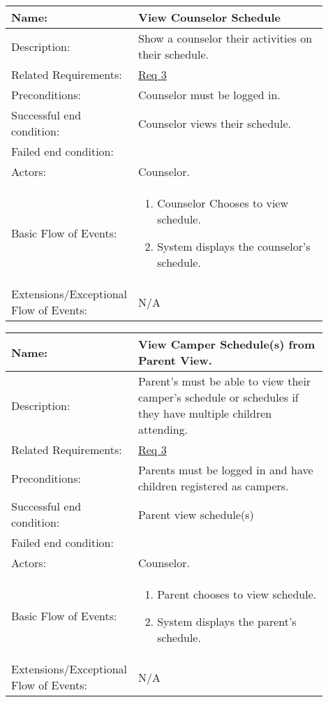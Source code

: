 \documentclass[11pt]{article}
\begin{document}
\begin{table}[!htb]
\begin{center}
\begin{tabular}{p{0.30\linewidth}p{0.60\linewidth}}
	Name: & View Counselor Schedule\\\hline
	Description: & Show a counselor their activities on their schedule.\\\hline
	Related Requirements:& \hyperlink{Req3}{Req 3}\\\hline
	Preconditions:& Counselor must be logged in.\\\hline
	Successful end condition:& Counselor views their schedule. \\\hline
	Failed end condition:& \\\hline
	Actors:& Counselor. \\\hline
	Basic Flow of Events: & \begin{enumerate}[topsep=0pt]
		\item Counselor Chooses to view schedule.
		\item System displays the counselor's schedule.
	\end{enumerate}\\\hline
	Extensions/Exceptional Flow of Events: & \vspace*{.25em}  N/A
\end{tabular}
\label{des:view counselor schedules}	
\end{center}
\end{table}

\begin{table}[!htb]
\begin{center}
\begin{tabular}{p{0.30\linewidth}p{0.60\linewidth}}
	Name: & View Camper Schedule(s) from Parent View.\\\hline
	Description: & Parent's must be able to view their camper's schedule or schedules if they have multiple children attending.\\\hline
	Related Requirements:& \hyperlink{Req3}{Req 3}\\\hline
	Preconditions:& Parents must be logged in and have children registered as campers.\\\hline
	Successful end condition:& Parent view schedule(s) \\\hline
	Failed end condition:& \\\hline
	Actors:& Counselor. \\\hline
	Basic Flow of Events: & \begin{enumerate}[topsep=0pt]
		\item Parent chooses to view schedule.
		\item System displays the parent's schedule.
	\end{enumerate}\\\hline
	Extensions/Exceptional Flow of Events: & \vspace*{.25em}  N/A
\end{tabular}
\label{des:view camper schedules}	
\end{center}
\end{table}
\end{document}

